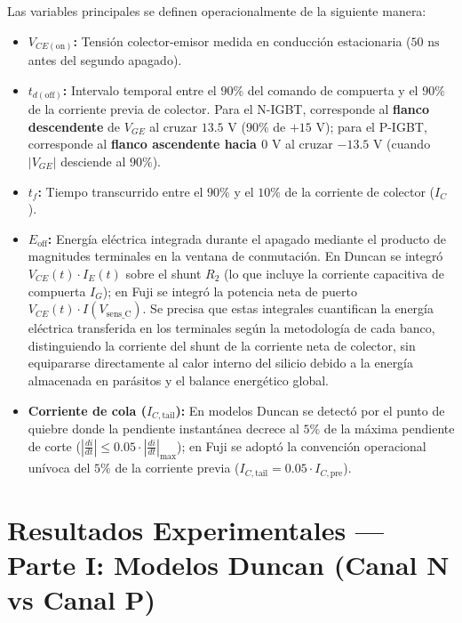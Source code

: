 \documentclass[11pt,a4paper]{article}
\begin{document}
Las variables principales se definen operacionalmente de la siguiente manera:
\begin{itemize}[leftmargin=*, noitemsep, topsep=2pt]
  \item \textbf{$V_{CE(\text{on})}$:} Tensión colector-emisor medida en conducción estacionaria ($50\text{ ns}$ antes del segundo apagado).
  \item \textbf{$t_{d(\text{off})}$:} Intervalo temporal entre el $90\%$ del comando de compuerta y el $90\%$ de la corriente previa de colector. Para el N-IGBT, corresponde al \textbf{flanco descendente} de $V_{GE}$ al cruzar $13.5\text{ V}$ ($90\%$ de $+15\text{ V}$); para el P-IGBT, corresponde al \textbf{flanco ascendente hacia $0\text{ V}$} al cruzar $-13.5\text{ V}$ (cuando $|V_{GE}|$ desciende al $90\%$).
  \item \textbf{$t_f$:} Tiempo transcurrido entre el $90\%$ y el $10\%$ de la corriente de colector ($I_C$).
  \item \textbf{$E_{\text{off}}$:} Energía eléctrica integrada durante el apagado mediante el producto de magnitudes terminales en la ventana de conmutación. En Duncan se integró $V_{CE}(t) \cdot I_E(t)$ sobre el shunt $R_2$ (lo que incluye la corriente capacitiva de compuerta $I_G$); en Fuji se integró la potencia neta de puerto $V_{CE}(t) \cdot I(V_{\text{sens\_C}})$. Se precisa que estas integrales cuantifican la energía eléctrica transferida en los terminales según la metodología de cada banco, distinguiendo la corriente del shunt de la corriente neta de colector, sin equipararse directamente al calor interno del silicio debido a la energía almacenada en parásitos y el balance energético global.
  \item \textbf{Corriente de cola ($I_{C,\text{tail}}$):} En modelos Duncan se detectó por el punto de quiebre donde la pendiente instantánea decrece al $5\%$ de la máxima pendiente de corte ($\left|\frac{di}{dt}\right| \le 0.05 \cdot \left|\frac{di}{dt}\right|_{\max}$); en Fuji se adoptó la convención operacional unívoca del $5\%$ de la corriente previa ($I_{C,\text{tail}} = 0.05 \cdot I_{C,\text{pre}}$).
\end{itemize}

\section{Resultados Experimentales — Parte I: Modelos Duncan (Canal N vs Canal P)}
\end{document}
